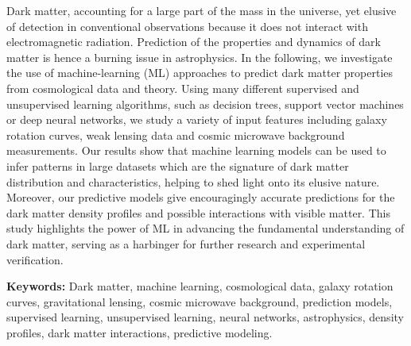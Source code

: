 
Dark matter, accounting for a large part of the mass in the universe, yet elusive of detection in conventional observations because it does not interact with electromagnetic radiation. Prediction of the properties and dynamics of dark matter is hence a burning issue in astrophysics. In the following, we investigate the use of machine-learning (ML) approaches to predict dark matter properties from cosmological data and theory. Using many different supervised and unsupervised learning algorithms, such as decision trees, support vector machines or deep neural networks, we study a variety of input features including galaxy rotation curves, weak lensing data and cosmic microwave background measurements. Our results show that machine learning models can be used to infer patterns in large datasets which are the signature of dark matter distribution and characteristics, helping to shed light onto its elusive nature. Moreover, our predictive models give encouragingly accurate predictions for the dark matter density profiles and possible interactions with visible matter. This study highlights the power of ML in advancing the fundamental understanding of dark matter, serving as a harbinger for further research and experimental verification.


\vspace{8pt}
\textbf{Keywords:} Dark matter, machine learning, cosmological data, galaxy rotation curves, gravitational lensing, cosmic microwave background, prediction models, supervised learning, unsupervised learning, neural networks, astrophysics, density profiles, dark matter interactions, predictive modeling. 

 

